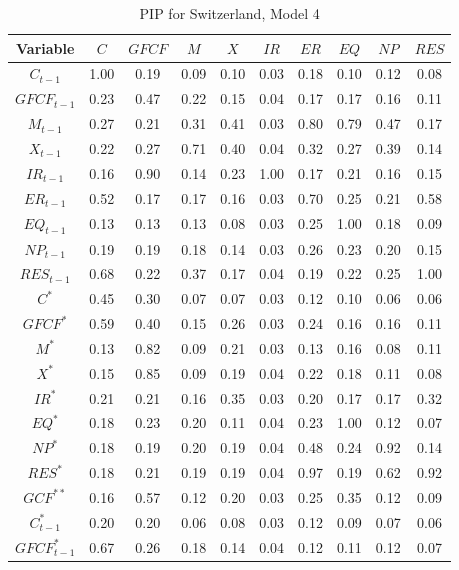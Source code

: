 \documentclass[a4paper, twoside]{templates/ociamthesis}
\begin{document}
\begin{table}[!ht]

\caption{\label{tab:TablePIPCH4}PIP for Switzerland, Model 4}
\centering
\fontsize{7}{9}\selectfont
\begin{tabular}[t]{cccccccccc}
\toprule
Variable & $C$ & $GFCF$ & $M$ & $X$ & $IR$ & $ER$ & $EQ$ & $NP$ & $RES$\\
\midrule
$C_{t-1}$ & 1.00 & 0.19 & 0.09 & 0.10 & 0.03 & 0.18 & 0.10 & 0.12 & 0.08\\
$GFCF_{t-1}$ & 0.23 & 0.47 & 0.22 & 0.15 & 0.04 & 0.17 & 0.17 & 0.16 & 0.11\\
$M_{t-1}$ & 0.27 & 0.21 & 0.31 & 0.41 & 0.03 & 0.80 & 0.79 & 0.47 & 0.17\\
$X_{t-1}$ & 0.22 & 0.27 & 0.71 & 0.40 & 0.04 & 0.32 & 0.27 & 0.39 & 0.14\\
$IR_{t-1}$ & 0.16 & 0.90 & 0.14 & 0.23 & 1.00 & 0.17 & 0.21 & 0.16 & 0.15\\
$ER_{t-1}$ & 0.52 & 0.17 & 0.17 & 0.16 & 0.03 & 0.70 & 0.25 & 0.21 & 0.58\\
$EQ_{t-1}$ & 0.13 & 0.13 & 0.13 & 0.08 & 0.03 & 0.25 & 1.00 & 0.18 & 0.09\\
$NP_{t-1}$ & 0.19 & 0.19 & 0.18 & 0.14 & 0.03 & 0.26 & 0.23 & 0.20 & 0.15\\
$RES_{t-1}$ & 0.68 & 0.22 & 0.37 & 0.17 & 0.04 & 0.19 & 0.22 & 0.25 & 1.00\\
$C^*$ & 0.45 & 0.30 & 0.07 & 0.07 & 0.03 & 0.12 & 0.10 & 0.06 & 0.06\\
$GFCF^*$ & 0.59 & 0.40 & 0.15 & 0.26 & 0.03 & 0.24 & 0.16 & 0.16 & 0.11\\
$M^*$ & 0.13 & 0.82 & 0.09 & 0.21 & 0.03 & 0.13 & 0.16 & 0.08 & 0.11\\
$X^*$ & 0.15 & 0.85 & 0.09 & 0.19 & 0.04 & 0.22 & 0.18 & 0.11 & 0.08\\
$IR^*$ & 0.21 & 0.21 & 0.16 & 0.35 & 0.03 & 0.20 & 0.17 & 0.17 & 0.32\\
$EQ^*$ & 0.18 & 0.23 & 0.20 & 0.11 & 0.04 & 0.23 & 1.00 & 0.12 & 0.07\\
$NP^*$ & 0.18 & 0.19 & 0.20 & 0.19 & 0.04 & 0.48 & 0.24 & 0.92 & 0.14\\
$RES^*$ & 0.18 & 0.21 & 0.19 & 0.19 & 0.04 & 0.97 & 0.19 & 0.62 & 0.92\\
$GCF^{**}$ & 0.16 & 0.57 & 0.12 & 0.20 & 0.03 & 0.25 & 0.35 & 0.12 & 0.09\\
$C^*_{t-1}$ & 0.20 & 0.20 & 0.06 & 0.08 & 0.03 & 0.12 & 0.09 & 0.07 & 0.06\\
$GFCF^*_{t-1}$ & 0.67 & 0.26 & 0.18 & 0.14 & 0.04 & 0.12 & 0.11 & 0.12 & 0.07\\

\end{tabular}
\end{table}
\end{document}

